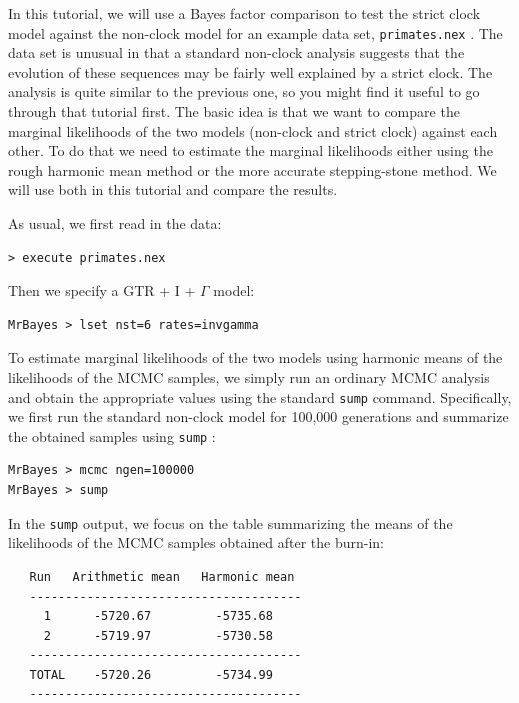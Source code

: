 \documentclass[12pt]{book}
\newcommand{\ttt}[1]{\texttt{#1} }
\begin{document}
In this tutorial, we will use a Bayes factor comparison to test the strict clock model against the
non-clock model for an example data set, \ttt{primates.nex}. The data set is unusual in that a
standard non-clock analysis suggests that the evolution of these sequences may be fairly well
explained by a strict clock. The analysis is quite similar to the previous one, so you might find
it useful to go through that tutorial first. The basic idea is that we want to compare the marginal
likelihoods of the two models (non-clock and strict clock) against each other. To do that we need
to estimate the marginal likelihoods either using the rough harmonic mean method or the more
accurate stepping-stone method. We will use both in this tutorial and compare the results.

As usual, we first read in the data:

\begin{verbatim}
> execute primates.nex
\end{verbatim}

Then we specify a GTR + I + $\Gamma$ model:

\begin{verbatim}
MrBayes > lset nst=6 rates=invgamma
\end{verbatim}

To estimate marginal likelihoods of the two models using harmonic means of the likelihoods of the
MCMC samples, we simply run an ordinary MCMC analysis and obtain the appropriate values using the
standard \ttt{sump} command. Specifically, we first run the standard non-clock model for 100,000
generations and summarize the obtained samples using \ttt{sump}:

\begin{singlespacing}
\begin{verbatim}
MrBayes > mcmc ngen=100000
MrBayes > sump
\end{verbatim}
\end{singlespacing}

In the \ttt{sump} output, we focus on the table summarizing the means of the likelihoods of the
MCMC samples obtained after the burn-in:

\begin{singlespacing}
\begin{verbatim}
   Run   Arithmetic mean   Harmonic mean
   --------------------------------------
     1      -5720.67         -5735.68
     2      -5719.97         -5730.58
   --------------------------------------
   TOTAL    -5720.26         -5734.99
   --------------------------------------
\end{verbatim}
\end{singlespacing}
\end{document}
